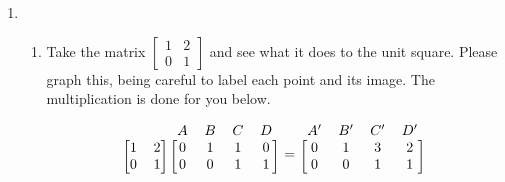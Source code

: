 \documentclass[../textbook.tex]{subfiles}
\begin{document}
\begin{enumerate}
\setcounter{enumi}{\value{mp_problem_i}}
\item \begin{enumerate}
\item Take the matrix $\left[\begin{array}{cc}1 & 2 \\ 0 & 1\end{array}\right]$ and see what it does to the unit square. Please graph this, being careful to label each point and its image. The multiplication is done for you below.

$$\begin{blockarray}{cccccc}
& & A & B & C & D \\
\begin{block}{[cc][cccc]}
1 & 2 & 0 & 1 & 1 & 0 \\
0 & 1 & 0 & 0 & 1 & 1 \\
\end{block}
\end{blockarray} =
\begin{blockarray}{cccc}
A' & B' & C' & D' \\
\begin{block}{[cccc]}
0 & 1 & 3 & 2 \\
0 & 0 & 1 & 1 \\
\end{block}
\end{blockarray}$$


\end{enumerate}
\end{enumerate}
\end{document}
